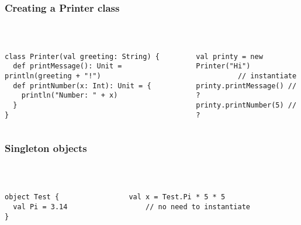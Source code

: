 \documentclass[aspectratio=169]{beamer}
\begin{document}
\begin{frame}[fragile]\frametitle{Creating a Printer class}
~\\[-8mm]
\begin{columns}
\begin{column}{0.52\textwidth}
\begin{lstlisting}
class Printer(val greeting: String) {
  def printMessage(): Unit = println(greeting + "!")
  def printNumber(x: Int): Unit = {
    println("Number: " + x)
  }
}
\end{lstlisting}
\end{column}
\begin{column}{0.44\textwidth}
%
\pause
\begin{lstlisting}
val printy = new Printer("Hi")
          // instantiate
printy.printMessage() // ?
printy.printNumber(5) // ?
\end{lstlisting}
\end{column}
\end{columns}
\end{frame}


\begin{frame}[fragile]\frametitle{Singleton objects}
~\\[-8mm]
\begin{columns}
\begin{column}{0.44\textwidth}
\begin{lstlisting}
object Test {
  val Pi = 3.14
}
\end{lstlisting}
\end{column}
\begin{column}{0.52\textwidth}
\begin{lstlisting}
val x = Test.Pi * 5 * 5
    // no need to instantiate
\end{lstlisting}%
\end{column}
\end{columns}
\end{frame}
\end{document}
